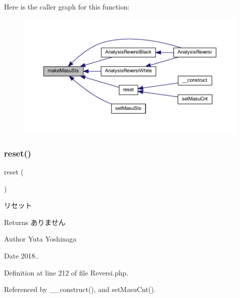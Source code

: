 Here is the caller graph for this function\+:
\nopagebreak
\begin{figure}[H]
\begin{center}
\leavevmode
\includegraphics[width=350pt]{class_reversi_a88869682786bb7c45c3488113deaa789_icgraph}
\end{center}
\end{figure}
\mbox{\label{class_reversi_a4a20559544fdf4dcb457e258dc976cf8}} 
\subsubsection{\texorpdfstring{reset()}{reset()}}
{\footnotesize\ttfamily reset (\begin{DoxyParamCaption}{ }\end{DoxyParamCaption})}



リセット 

\begin{DoxyReturn}{Returns}
ありません 
\end{DoxyReturn}
\begin{DoxyAuthor}{Author}
Yuta Yoshinaga 
\end{DoxyAuthor}
\begin{DoxyDate}{Date}
2018.. 
\end{DoxyDate}


Definition at line 212 of file Reversi.\+php.



Referenced by \+\_\+\+\_\+construct(), and set\+Masu\+Cnt().

